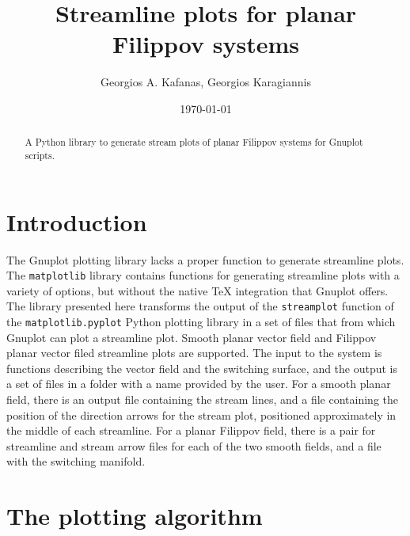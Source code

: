 \documentclass[english, a4paper]{article}
\begin{document}
\graphicspath{{Resources/Images/}{Resources/Diagrams/}}

\onehalfspacing
{}

\title{Streamline plots for planar Filippov systems}
\author{Georgios A. Kafanas, Georgios Karagiannis}
\date{\today}

\maketitle

\begin{abstract}
A Python library to generate stream plots of planar Filippov systems for Gnuplot scripts.
\end{abstract}

\thispagestyle{empty}
\restoregeometry

\clearpage

\tableofcontents
\listoffigures
\listoftables
\listofalgorithms

\clearpage


\section{Introduction}

The Gnuplot plotting library lacks a proper function to generate streamline plots. The \texttt{matplotlib} library contains functions for generating streamline plots with a variety of options, but without the native TeX integration that Gnuplot offers. The library presented here transforms the output of the \texttt{streamplot} function of the \texttt{matplotlib.pyplot} Python plotting library in a set of files that from which Gnuplot can plot a streamline plot. Smooth planar vector field and Filippov planar vector filed streamline plots are supported. The input to the system is functions describing the vector field and the switching surface, and the output is a set of files in a folder with a name provided by the user. For a smooth planar field, there is an output file containing the stream lines, and a file containing the position of the direction arrows for the stream plot, positioned approximately in the middle of each streamline. For a planar Filippov field, there is a pair for streamline and stream arrow files for each of the two smooth fields, and a file with the switching manifold.

\section{The plotting algorithm}
\end{document}
